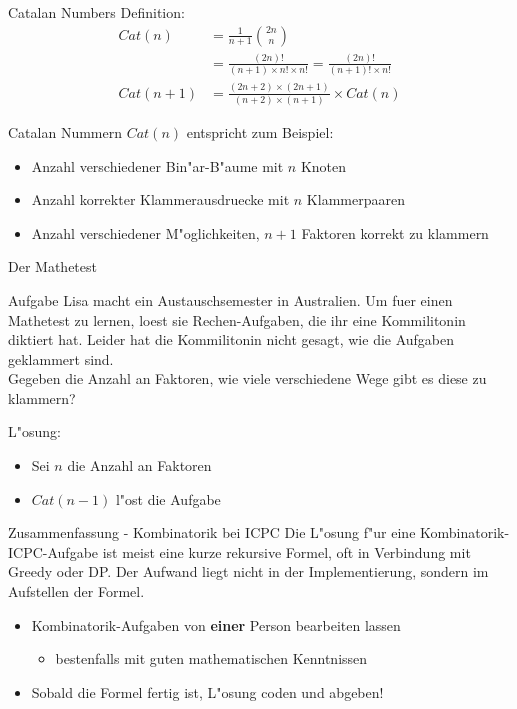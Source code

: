 \documentclass[18pt]{beamer}
\begin{document}
\begin{frame}{Catalan Numbers}
Definition:
\begin{align*}
Cat \left( n \right) &= \frac{1}{n+1} \binom{2n}{n} \\
&= \frac{\left( 2n \right)!}{\left( n+1 \right) \times n! \times n!} = \frac{\left( 2n \right) !}{\left( n+1 \right) ! \times n!} \\
Cat \left( n + 1 \right) &= \frac{\left( 2n + 2 \right) \times \left( 2n + 1 \right)}{\left( n + 2 \right) \times \left( n + 1 \right)} \times Cat \left( n \right)
\end{align*}
\end{frame}

\begin{frame}{Catalan Nummern}
$Cat \left( n \right)$ entspricht zum Beispiel:
\begin{itemize}
\item Anzahl verschiedener Bin"ar-B"aume mit $n$ Knoten
\item Anzahl korrekter Klammerausdruecke mit $n$ Klammerpaaren
\item Anzahl verschiedener M"oglichkeiten, $n+1$ Faktoren korrekt zu klammern
\end{itemize}
\end{frame}

\begin{frame}{Der Mathetest}
\begin{block}{Aufgabe}
Lisa macht ein Austauschsemester in Australien. Um fuer einen Mathetest zu lernen, loest sie Rechen-Aufgaben, die ihr eine Kommilitonin diktiert hat. Leider hat die Kommilitonin nicht gesagt, wie die Aufgaben geklammert sind. \\
Gegeben die Anzahl an Faktoren, wie viele verschiedene Wege gibt es diese zu klammern?
\end{block}
L"osung:
\begin{itemize}
\item Sei $n$ die Anzahl an Faktoren
\item $Cat \left( n-1 \right)$ l"ost die Aufgabe
\end{itemize}
\end{frame}

\begin{frame}{Zusammenfassung - Kombinatorik bei ICPC}
Die L"osung f"ur eine Kombinatorik-ICPC-Aufgabe ist meist eine kurze rekursive Formel, oft in Verbindung mit Greedy oder DP. Der Aufwand liegt nicht in der Implementierung, sondern im Aufstellen der Formel.
\begin{itemize}
\item Kombinatorik-Aufgaben von \textbf{einer} Person bearbeiten lassen

\begin{itemize}
\item bestenfalls mit guten mathematischen Kenntnissen
\end{itemize}

\item Sobald die Formel fertig ist, L"osung coden und abgeben!
\end{itemize}
\end{frame}
\end{document}
